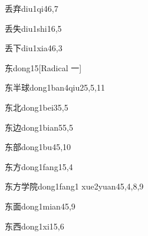 \begin{entry}{丢弃}{diu1qi4}{6,7}
\end{entry}

\begin{entry}{丢失}{diu1shi1}{6,5}
\end{entry}

\begin{entry}{丢下}{diu1xia4}{6,3}
\end{entry}

\begin{entry}{东}{dong1}{5}[Radical ⼀]
\end{entry}

\begin{entry}{东半球}{dong1ban4qiu2}{5,5,11}
\end{entry}

\begin{entry}{东北}{dong1bei3}{5,5}
\end{entry}

\begin{entry}{东边}{dong1bian5}{5,5}
\end{entry}

\begin{entry}{东部}{dong1bu4}{5,10}
\end{entry}

\begin{entry}{东方}{dong1fang1}{5,4}
\end{entry}

\begin{entry}{东方学院}{dong1fang1 xue2yuan4}{5,4,8,9}
\end{entry}

\begin{entry}{东面}{dong1mian4}{5,9}
\end{entry}

\begin{entry}{东西}{dong1xi1}{5,6}
\end{entry}

